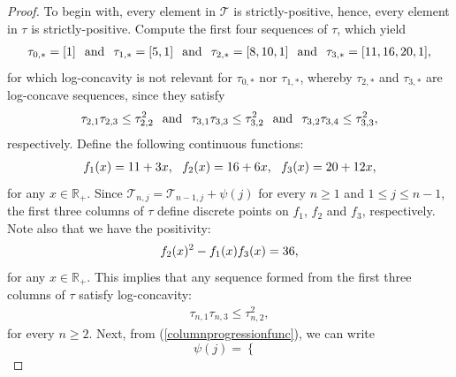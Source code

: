 \documentclass[a4paper,12pt]{article}
\def\R{\mathbb{R}}
\def\T{\mathcal{T}}
\begin{document}
\begin{proof}
To begin with, every element in $\T$ is strictly-positive, hence, every element in $\tau$ is strictly-positive. Compute the first four sequences of $\tau$, which yield 
\begin{align}
\tau_{0,*} = [1] \hspace{0.1in} \text{and} \hspace{0.1in} \tau_{1,*} = [5,1] \hspace{0.1in} \text{and} \hspace{0.1in} \tau_{2,*} = [8,10,1] \hspace{0.1in} \text{and} \hspace{0.1in} \tau_{3,*} = [11,16,20,1], \label{initialtauseq} 
\end{align}
for which log-concavity is not relevant for $\tau_{0,*}$ nor $\tau_{1,*}$, whereby $\tau_{2,*}$ and $\tau_{3,*}$ are log-concave sequences, since they satisfy 
\begin{align}
\tau_{2,1}\tau_{2,3} \leq \tau_{2,2}^2 \hspace{0.1in} \text{and} \hspace{0.1in} \tau_{3,1}\tau_{3,3} \leq \tau_{3,2}^2 \hspace{0.1in} \text{and} \hspace{0.1in} \tau_{3,2}\tau_{3,4} \leq \tau_{3,3}^2, \label{initiallogconcaveprop} 
\end{align}
respectively. Define the following continuous functions: 
\begin{align}
f_1(x) = 11 + 3x, \,\,\,\, f_2(x) = 16 + 6x, \,\,\,\, f_3(x) = 20 + 12x, \notag 
\end{align}
for any $x\in\R_+$. Since $\T_{n,j} = \T_{n-1,j} + \psi(j)$ for every $n \geq 1$ and $1 \leq j \leq n-1$, the first three columns of $\tau$ define discrete points on $f_1$, $f_2$ and $f_3$, respectively. Note also that we have the positivity:
\begin{align}
f_2(x)^2 - f_1(x)f_3(x) = 36, \notag 
\end{align}
for any $x\in\R_+$. This implies that any sequence formed from the first three columns of $\tau$ satisfy log-concavity:
\begin{align}
\label{funcapprox}
\tau_{n,1}\tau_{n,3} \leq \tau_{n,2}^2,
\end{align}
for every $n\geq 2$. Next, from (\ref{columnprogressionfunc}), we can write
\begin{equation}
\label{columnprogressiontwo}
\psi(j) =
\begin{cases}

\end{cases}
\end{equation}
\end{proof}
\end{document}
